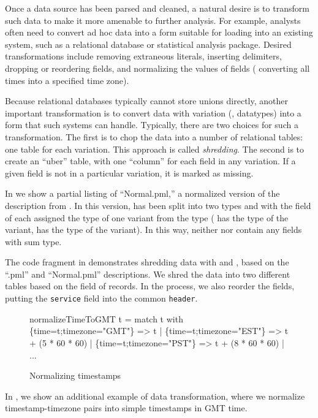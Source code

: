 Once a data source has been parsed and cleaned, a natural desire is to
transform such data to make it more amenable to further analysis.  For
example, analysts often need to convert ad hoc data into a form
suitable for loading into an existing system, such as a relational
database or statistical analysis package. Desired transformations
include removing extraneous literals, inserting delimiters, dropping
or reordering fields, and normalizing the values of fields (\eg{}
converting all times into a specified time zone).

Because relational databases typically cannot store unions directly,
another important transformation is to convert data with variation
(\ie{}, datatypes) into a form that such systems can handle.
Typically, there are two choices for such a transformation.  The first
is to chop the data into a number of relational tables: one table for
each variation.  This approach is called \textit{shredding}. The
second is to create an ``uber'' table, with one ``column'' for each
field in any variation.  If a given field is not in a particular
variation, it is marked as missing. 

In  we show a partial listing of
``\darkstar{}Normal.pml,'' a normalized version of the \darkstar{}
description from . In this version,
 has been split into two types  and
 with the  field of each assigned the type of one
variant from the  type ( has the type of the
 variant,  has the type of the
 variant). In this way, neither  nor
 contain any fields with sum type.  

The code fragment in  demonstrates
shredding \darkstar{} data with \padsml{} and \ocaml{}, based on the
``\darkstar{}.pml'' and ``\darkstar{}Normal.pml'' descriptions. We
shred the data into two different tables based on the  field
of  records. In the process, we also reorder the fields,
putting the \texttt{service} field into the common \texttt{header}.

\begin{figure}
  \centering
  \begin{code}\scriptsize
{} normalizeTimeToGMT t = 
    match t with
      \{time=t;timezone="GMT"\} => t
    | \{time=t;timezone="EST"\} => t + (5 * 60 * 60)
    | \{time=t;timezone="PST"\} => t + (8 * 60 * 60)
    | ... \end{code}
  \caption{Normalizing timestamps}
  \label{fig:ex-normalize}
\end{figure}

In , we show an additional example of data
transformation, where we normalize timestamp-timezone pairs into
simple timestamps in GMT time.


